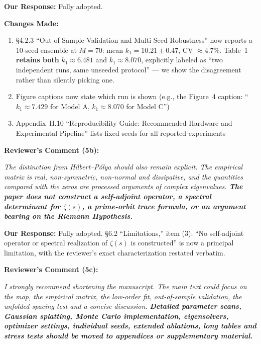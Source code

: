 \documentclass[11pt]{article}
\begin{document}
\noindent\textbf{Our Response:} Fully adopted.

\noindent\textbf{Changes Made:}
\begin{enumerate}
\item \S4.2.3 ``Out-of-Sample Validation and Multi-Seed Robustness'' now reports a 10-seed ensemble at $M=70$: mean $k_1 = 10.21 \pm 0.47$, CV $\approx4.7\%$. Table~1 \textbf{retains both} $k_1\approx6.481$ and $k_1\approx8.070$, explicitly labeled as ``two independent runs, same unseeded protocol'' --- we show the disagreement rather than silently picking one.
\item Figure captions now state which run is shown (e.g., the Figure~4 caption: ``$k_1\approx7.429$ for Model A, $k_1\approx8.070$ for Model C'')
\item Appendix~H.10 ``Reproducibility Guide: Recommended Hardware and Experimental Pipeline'' lists fixed seeds for all reported experiments
\end{enumerate}

\vspace{0.3cm}
\noindent\textbf{Reviewer's Comment (5b):}
\begin{quotebox}
\itshape The distinction from Hilbert--P\'olya should also remain explicit. The empirical matrix is real, non-symmetric, non-normal and dissipative, and the quantities compared with the zeros are processed arguments of complex eigenvalues. \textbf{The paper does not construct a self-adjoint operator, a spectral determinant for $\zeta(s)$, a prime-orbit trace formula, or an argument bearing on the Riemann Hypothesis.}
\end{quotebox}

\noindent\textbf{Our Response:} Fully adopted. \S6.2 ``Limitations,'' item (3): ``No self-adjoint operator or spectral realization of $\zeta(s)$ is constructed'' is now a principal limitation, with the reviewer's exact characterization restated verbatim.

\vspace{0.3cm}
\noindent\textbf{Reviewer's Comment (5c):}
\begin{quotebox}
\itshape I strongly recommend shortening the manuscript. The main text could focus on the map, the empirical matrix, the low-order fit, out-of-sample validation, the unfolded-spacing test and a concise discussion. \textbf{Detailed parameter scans, Gaussian splatting, Monte Carlo implementation, eigensolvers, optimizer settings, individual seeds, extended ablations, long tables and stress tests should be moved to appendices or supplementary material.}
\end{quotebox}
\end{document}
